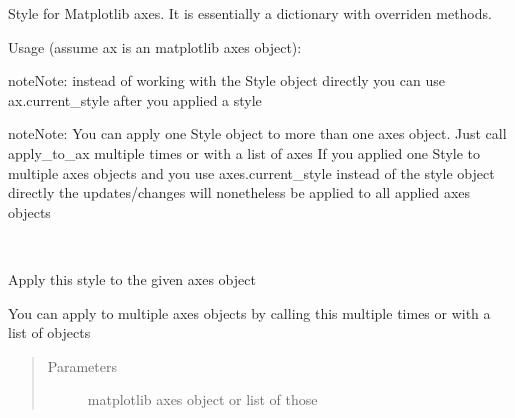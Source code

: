 \documentclass[letterpaper,10pt,openany,oneside,english]{sphinxmanual}
\begin{document}

\begin{fulllineitems}
\label{\detokenize{config:config.Style}}
Style for Matplotlib axes.  
It is essentially a dictionary with overriden methods.

Usage (assume ax is an matplotlib axes object):

\begin{sphinxVerbatim}[commandchars=\\\{\}]
    
   
\PYG{p}{[}\PYG{p}{]}  
\end{sphinxVerbatim}

\begin{sphinxadmonition}{note}{Note:}
instead of working with the Style object directly you can use ax.current\_style after you applied a style
\end{sphinxadmonition}

\begin{sphinxadmonition}{note}{Note:}
You can apply one Style object to more than one axes object. Just call apply\_to\_ax multiple times or with a list of axes  
If you applied one Style to multiple axes objects and you use axes.current\_style instead of the style object  
directly the updates/changes will nonetheless be applied to all applied axes objects
\end{sphinxadmonition}

\begin{fulllineitems}
\label{\detokenize{config:config.Style.apply_to_ax}}~
\begin{DUlineblock}{0em}
\item[] Apply this style to the given axes object  
\item[] You can apply to multiple axes objects by calling this multiple times or with a list of objects  
\end{DUlineblock}
\begin{quote}\begin{description}
\item[{Parameters}] \leavevmode
{} \textendash{} matplotlib axes object or list of those


\end{description}
\end{quote}
\end{fulllineitems}
\end{fulllineitems}
\end{document}
